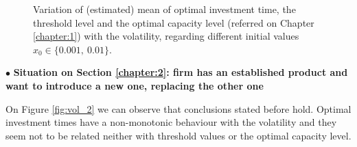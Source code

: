 \begin{figure}[!ht]
	\begin{subfigmatrix}{2}
	\end{subfigmatrix}
	\caption{Variation of (estimated) mean of optimal investment time, the threshold level and the optimal capacity level (referred on Chapter \ref{chapter:1}) with the volatility, regarding different initial values $x_0 \in \{0.001, \ 0.01\}$.}
	\label{fig:var_1}
\end{figure}




\vspace{3mm}
$\bullet$ \textbf{Situation on Section \ref{chapter:2}: firm has an established product and want to introduce a new one, replacing the other one}


On Figure \ref{fig:vol_2} we can observe that conclusions stated before hold. Optimal investment times have a non-monotonic behaviour with the volatility and they seem not to be related neither with threshold values or the optimal capacity level. 

